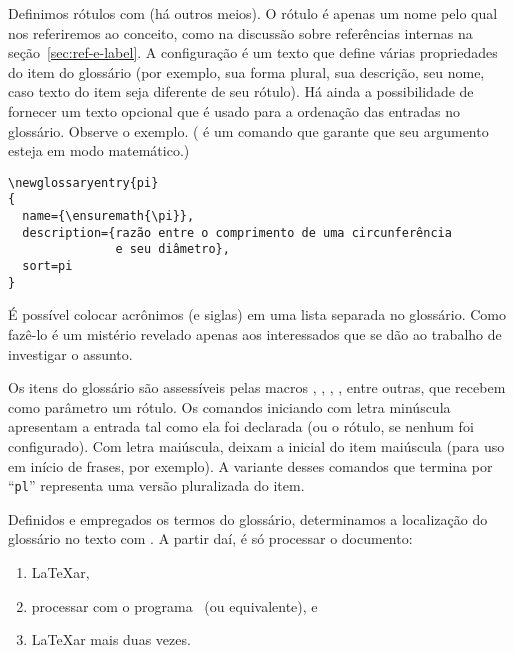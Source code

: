 Definimos rótulos com
(há outros meios). O rótulo é apenas um nome pelo qual nos referiremos
ao conceito, como na discussão sobre referências internas na
seção~\ref{sec:ref-e-label}. A configuração é um texto que define
várias propriedades do item do glossário (por exemplo, sua forma plural, sua
descrição, seu nome, caso texto do item seja diferente de seu
rótulo). Há ainda a possibilidade de fornecer um texto opcional que é
usado para a ordenação das entradas no glossário. Observe o
exemplo. ( é um comando que garante que seu
argumento esteja em modo matemático.)

\begin{verbatim}
\newglossaryentry{pi}
{
  name={\ensuremath{\pi}},
  description={razão entre o comprimento de uma circunferência 
               e seu diâmetro},
  sort=pi
}
\end{verbatim}

É possível colocar acrônimos (e siglas) em uma lista separada no
glossário. Como fazê-lo é um mistério revelado apenas aos interessados
que se dão ao trabalho de investigar o assunto.

Os itens do glossário são  assessíveis pelas macros
, , , ,
entre outras, que recebem como parâmetro um rótulo. Os comandos
iniciando com letra minúscula apresentam a entrada tal como ela foi
declarada (ou o rótulo, se nenhum  foi
configurado). Com letra maiúscula, deixam a inicial do item maiúscula
(para uso em início de frases, por exemplo). A variante desses
comandos que termina por ``{\tt pl}'' representa uma versão
pluralizada do item.

Definidos e empregados os termos do glossário, determinamos a
localização do glossário no texto com . A
partir daí, é só processar o documento:
\begin{enumerate}
\item \LaTeX ar,
\item processar com o programa~ (ou
  equivalente), e
\item \LaTeX ar mais duas vezes.
\end{enumerate}
